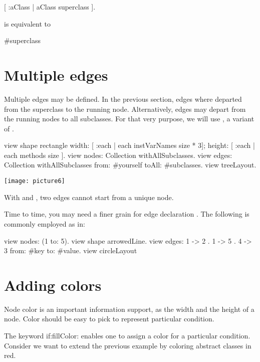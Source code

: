 \documentclass[a4paper,10pt,twoside]{book}
\begin{document}
\begin{code}{}
[ :aClass | aClass superclass ].
\end{code}

is equivalent to
\begin{code}{}
#superclass
\end{code}

\section{Multiple edges}
Multiple edges may be defined. In the previous section, edges where departed from the superclass to the running node. Alternatively, edges may depart from the running nodes to all subclasses. For that very purpose, we will use , a variant of .

\begin{code}{}
view shape rectangle
  width: [ :each | each instVarNames size * 3];
  height: [ :each | each methods size ].
view nodes: Collection withAllSubclasses.
view edges: Collection withAllSubclasses from: #yourself toAll: #subclasses.
view treeLayout.
\end{code}
\begin{center}\texttt{[image: picture6]}\end{center}


With  and , two edges cannot start from a unique node.

Time to time, you may need a finer grain for edge declaration . The following is commonly employed as in:

\begin{code}{}
view nodes: (1 to: 5). 
view shape arrowedLine. 
view edges: { 1 -> 2 . 1 -> 5 . 4 -> 3 } from: #key to: #value. 
view circleLayout
\end{code}

\section{Adding colors}
Node color  is an important information support, as the width and the height of a node. Color should be easy to pick to represent particular condition.

The keyword if:fillColor: enables one to assign a color for a particular condition. Consider we want to extend the previous example by coloring abstract classes in red.
\end{document}
